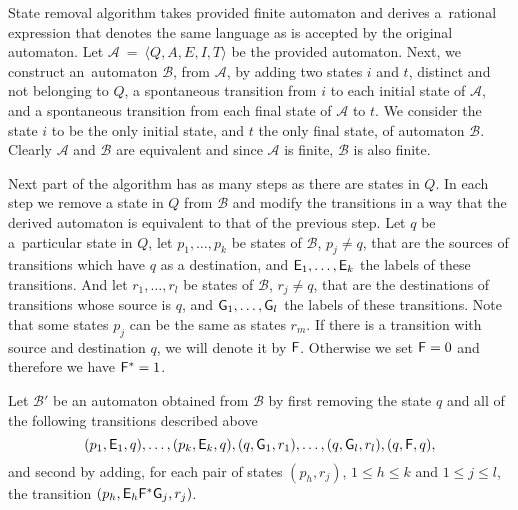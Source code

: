State removal algorithm takes provided finite automaton and derives a~rational expression that denotes the same language as is accepted by the original automaton. Let $\mathcal{A}~=~\langle Q, A, E, I, T \rangle$ be the provided automaton. Next, we construct an~automaton $\mathcal{B}$, from $\mathcal{A}$, by adding two states $i$ and $t$, distinct and not belonging to $Q$, a spontaneous transition from $i$ to each initial state of $\mathcal{A}$, and a spontaneous transition from each final state of $\mathcal{A}$ to $t$. We consider the state $i$ to be the only initial state, and $t$ the only final state, of automaton $\mathcal{B}$. Clearly $\mathcal{A}$ and $\mathcal{B}$ are equivalent and since $\mathcal{A}$ is finite, $\mathcal{B}$ is also finite.

Next part of the algorithm has as many steps as there are states in $Q$. In each step we remove a state in $Q$ from $\mathcal{B}$ and modify the transitions in a way that the derived automaton is equivalent to that of the previous step. Let $q$ be a~particular state in $Q$, let $p_1, \dotsc , p_k$ be states of $\mathcal{B}$, $p_j \neq q$, that are the sources of transitions which have $q$ as a destination, and ${\mathsf{E}}_1, \dotsc , {\mathsf{E}}_k$ the labels of these transitions. And let $r_1, \dotsc , r_l$ be states of $\mathcal{B}$, $r_j \neq q$, that are the destinations of transitions whose source is $q$, and ${\mathsf{G}}_1, \dotsc , {\mathsf{G}}_l$ the labels of these transitions. Note that some states $p_j$ can be the same as states $r_m$. If there is a transition with source and destination $q$, we will denote it by ${\mathsf{F}}$. Otherwise we set ${\mathsf{F}} = 0$ and therefore we have ${\mathsf{F}}^* = 1$.

Let $\mathcal{B}'$ be an automaton obtained from $\mathcal{B}$ by first removing the state $q$ and all of the following transitions described above
\[
    (p_1, {\mathsf{E}}_1, q), \dotsc, (p_k, {\mathsf{E}}_k, q), (q, {\mathsf{G}}_1, r_1), \dotsc, (q, {\mathsf{G}}_l, r_l), (q, {\mathsf{F}}, q),
\]
and second by adding, for each pair of states $(p_h, r_j)$, $1 \leq h \leq k$ and $1 \leq j \leq l$, the transition $(p_h, {\mathsf{E}}_h {\mathsf{F}}^* {\mathsf{G}}_j, r_j)$.


